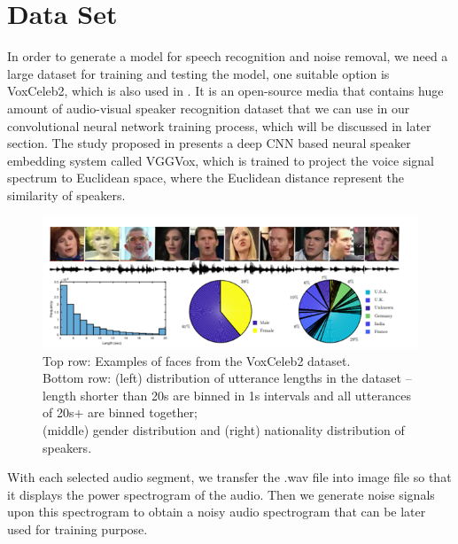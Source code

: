 \documentclass[runningheads,a4paper]{llncs}
\begin{document}
\section{Data Set}
In order to generate a model for speech recognition and noise removal, we need a large dataset for training and testing the model, one suitable option is VoxCeleb2, which is also used in \cite{7}. It is an open-source media that contains huge amount of audio-visual speaker recognition dataset that we can use in our convolutional neural network training process, which will be discussed in later section. The study proposed in \cite{7} presents a deep CNN based neural speaker embedding system called VGGVox, which is trained to project the voice signal spectrum to Euclidean space, where the Euclidean distance represent the similarity of speakers.\\

\begin{figure}[H]
\includegraphics[scale=0.6]{figure3.png}
\caption{Top row: Examples of faces from the VoxCeleb2 dataset.\\Bottom row: (left) distribution of utterance lengths in the dataset – length shorter than 20s are binned in 1s intervals and all utterances of 20s+ are binned together; \\(middle) gender distribution and (right) nationality distribution of speakers. \cite{7}}
\label{fig:framework}
\end{figure}

With each selected audio segment, we transfer the .wav file into image file so that it displays the power spectrogram of the audio. Then we generate noise signals upon this spectrogram to obtain a noisy audio spectrogram that can be later used for training purpose.\\



\end{document}

